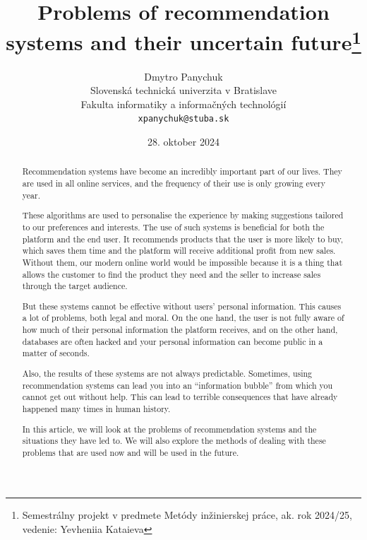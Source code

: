 \documentclass[10pt,twoside,slovak,a4paper]{article}
\title{Problems of recommendation systems and their uncertain future\thanks{Semestrálny projekt v predmete Metódy inžinierskej práce, ak. rok 2024/25, vedenie: Yevheniia Kataieva }}
\author{Dmytro Panychuk\\[2pt]
	{\small Slovenská technická univerzita v Bratislave}\\
	{\small Fakulta informatiky a informačných technológií}\\
	{\small \texttt{xpanychuk@stuba.sk}}
	}
\date{\small 28. oktober 2024}
\begin{document}
\maketitle

\begin{abstract}
\centering



Recommendation systems have become an incredibly important part of our lives. They are used in all online services, and the frequency of their use is only growing every year. 

These algorithms are used to personalise the experience by making suggestions tailored to our preferences and interests. The use of such systems is beneficial for both the platform and the end user. It recommends products that the user is more likely to buy, which saves them time and the platform will receive additional profit from new sales.  Without them, our modern online world would be impossible because it is a thing that allows the customer to find the product they need and the seller to increase sales through the target audience.

But these systems cannot be effective without users' personal information. This causes a lot of problems, both legal and moral. On the one hand, the user is not fully aware of how much of their personal information the platform receives, and on the other hand, databases are often hacked and your personal information can become public in a matter of seconds.

Also, the results of these systems are not always predictable. Sometimes, using recommendation systems can lead you into an “information bubble” from which you cannot get out without help. This can lead to terrible consequences that have already happened many times in human history. 

In this article, we will look at the problems of recommendation systems and the situations they have led to. We will also explore the methods of dealing with these problems that are used now and will be used in the future.
\newpage

\end{abstract}
\end{document}
